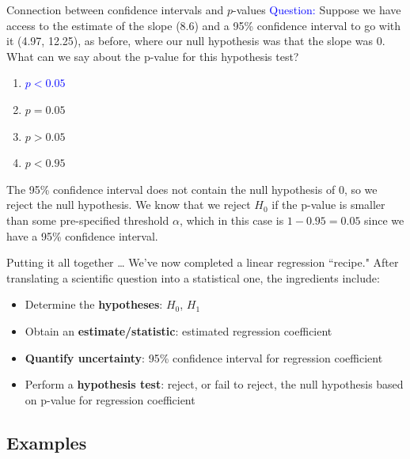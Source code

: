 \documentclass[10pt,t]{beamer}
\begin{document}
\begin{frame}{Connection between confidence intervals and $p$-values}
\textcolor{blue}{Question:} Suppose we have access to the estimate of the slope (8.6) and a 95\% confidence interval to go with it (4.97, 12.25), as before, where our null hypothesis was that the slope was $0$. What can we say about the p-value for this hypothesis test?

\vspace{0.3cm}

\begin{enumerate}
	\item \textcolor{blue}{$p < 0.05$}
	\item \sout{$p = 0.05$}
	\item \sout{$p > 0.05$}
	\item \sout{$p < 0.95$}
\end{enumerate}

\vspace{0.3cm}

The 95\% confidence interval does not contain the null hypothesis of $0$, so we reject the null hypothesis. We know that we reject $H_0$ if the p-value is smaller than some pre-specified threshold $\alpha$, which in this case is $1 - 0.95 = 0.05$ since we have a 95\% confidence interval.

\end{frame}



\begin{frame}{Putting it all together \dots}
We've now completed a linear regression ``recipe." After translating a scientific question into a statistical one, the ingredients include:

\vspace{0.3cm}

\begin{itemize}
	\item Determine the \textbf{hypotheses}: $H_0$, $H_1$
	\item Obtain an \textbf{estimate/statistic}: estimated regression coefficient
	\item \textbf{Quantify uncertainty}: 95\% confidence interval for regression coefficient
	\item Perform a \textbf{hypothesis test}: reject, or fail to reject, the null hypothesis based on p-value for regression coefficient
\end{itemize}
\end{frame}

\subsection{Examples}
\end{document}

